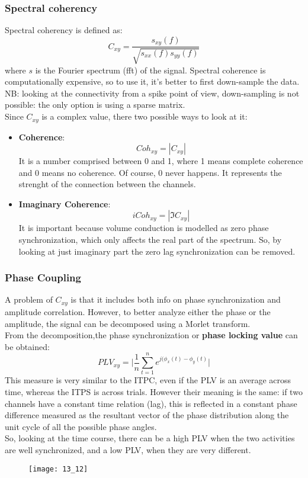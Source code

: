 \subsubsection{Spectral coherency}
Spectral coherency is defined as:
\begin{equation*}
C_{xy} = \frac{s_{xy}(f)}{\sqrt{s_{xx}(f)s_{yy}(f)}}
\end{equation*}
where \(s\) is the Fourier spectrum (fft) of the signal.
Spectral coherence is computationally expensive, so to use it, it's better to first down-sample the data.\\
NB: looking at the connectivity from a spike point of view, down-sampling is not possible: the only option is using a sparse matrix.\\
Since \(C_{xy}\) is a complex value, there two possible ways to look at it:
\begin{itemize}
    \item \textbf{Coherence}:
    \begin{equation*}
        Coh_{xy}=|C_{xy}|
    \end{equation*}
    It is a number comprised between 0 and 1, where 1 means complete coherence and 0 means no coherence. Of course, 0 never happens. It represents the strenght of the connection between the channels.
    \item \textbf{Imaginary Coherence}:
    \begin{equation*}
        iCoh_{xy}=|\Im{C_{xy}}|
    \end{equation*}
    It is important because volume conduction is modelled as zero phase synchronization, which only affects the real part of the spectrum. So, by looking at just imaginary part the zero lag synchronization can be removed.
\end{itemize}
\subsubsection{Phase Coupling}
A problem of \(C_{xy}\) is that it includes both info on phase synchronization and amplitude correlation. However, to better analyze either the phase or the amplitude, the signal can be decomposed using a Morlet transform. \\
From the decomposition,the phase synchronization or \textbf{phase locking value} can be obtained:
\begin{equation*}
    PLV_{xy}=\biggl|\frac{1}{n}\sum_{t=1}^ne^{j(\phi_x(t)-\phi_y(t)}\biggr|
\end{equation*}
This measure is very similar to the ITPC, even if the PLV is an average across time, whereas the ITPS is across trials. However their meaning is the same: if two channels have a constant time relation (lag), this is reflected in a constant phase difference measured as the resultant vector of the phase distribution along the unit cycle of all the possible phase angles.\\ 
So, looking at the time course, there can be a high PLV when the two activities are well synchronized, and a low PLV, when they are very different.
\begin{figure}[H]
    \centering
    \texttt{[image: 13\_12]}
\end{figure}

